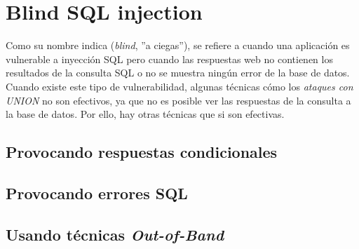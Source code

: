 \documentclass[bibliography=totocnumbered]{scrartcl}
\begin{document}
\section{Blind SQL injection}
Como su nombre indica (\textit{blind}, ''a ciegas''), se refiere a cuando una aplicación es vulnerable a inyección SQL pero cuando las respuestas web no contienen los resultados de la consulta SQL o no se muestra ningún error de la base de datos.\\

Cuando existe este tipo de vulnerabilidad, algunas técnicas cómo los \textit{ataques con UNION} no son efectivos, ya que no es posible ver las respuestas de la consulta a la base de datos. Por ello, hay otras técnicas que si son efectivas.
\subsection{Provocando respuestas condicionales}

\subsection{Provocando errores SQL}

\subsection{Usando técnicas \textit{Out-of-Band}}
\parencite{oast}

\newpage
\nocite{*}
\printbibliography 
\end{document}
